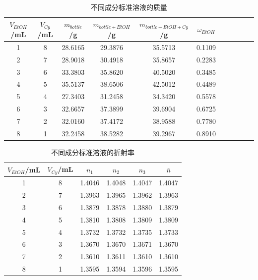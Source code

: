 \documentclass[cn,hazy,pku,12pt,normal,math=newtx,cite=super]{elegantnote}
\begin{document}
\begin{table}[h]
    \centering
    \caption{不同成分标准溶液的质量}
    \label{02}
    \begin{tabular}{ccccccccccc}
    \hline
    $V_{EtOH}$/mL & $V_{Cy}$/mL & $m_{bottle}$/g & $m_{bottle+EtOH}$/g & $m_{bottle+EtOH+Cy}$/g & $\omega_{EtOH}$ \\ \hline
    1          & 8        & 28.6165    & 29.3876      & 35.5713          & 0.1109              \\
    2          & 7        & 28.9018    & 30.4918      & 35.8657          & 0.2283              \\
    3          & 6        & 33.3803    & 35.8620      & 40.5020          & 0.3485              \\
    4          & 5        & 35.5137    & 38.6506      & 42.5012          & 0.4489              \\
    5          & 4        & 27.3403    & 31.2458      & 34.3420          & 0.5578              \\
    6          & 3        & 32.6657    & 37.3899      & 39.6904          & 0.6725              \\
    7          & 2        & 32.0160    & 37.4172      & 38.9588          & 0.7780              \\
    8          & 1        & 32.2458    & 38.5282      & 39.2967          & 0.8910              \\ \hline
    \end{tabular}
\end{table}

\begin{table}[h]
    \centering
    \caption{不同成分标准溶液的折射率}
    \label{03}
    \begin{tabular}{cccccc}
    \hline
    $V_{EtOH}$/mL & $V_{Cy}$/mL & $n_{1}$ & $n_{2}$ & $n_{3}$ & $\bar{n}$ \\ \hline
    1          & 8        & 1.4046  & 1.4048  & 1.4047  & 1.4047    \\
    2          & 7        & 1.3963  & 1.3965  & 1.3962  & 1.3963    \\
    3          & 6        & 1.3879  & 1.3878  & 1.3880  & 1.3879    \\
    4          & 5        & 1.3810  & 1.3808  & 1.3809  & 1.3809    \\
    5          & 4        & 1.3732  & 1.3732  & 1.3735  & 1.3733    \\
    6          & 3        & 1.3670  & 1.3670  & 1.3671  & 1.3670    \\
    7          & 2        & 1.3610  & 1.3611  & 1.3610  & 1.3610    \\
    8          & 1        & 1.3595  & 1.3594  & 1.3596  & 1.3595    \\ \hline
    \end{tabular}
\end{table}
\end{document}
